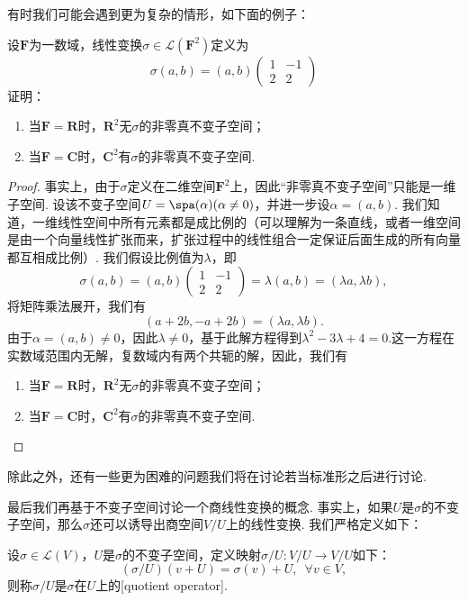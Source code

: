有时我们可能会遇到更为复杂的情形，如下面的例子：
\begin{example} \label{ex:18:不变子空间}
    设$\mathbf{F}$为一数域，线性变换$\sigma\in\mathcal{L}(\mathbf{F}^2)$定义为
    \[\sigma(a,b)=(a,b)\begin{pmatrix}
            1 & -1 \\ 2 & 2
        \end{pmatrix}\]
    证明：
    \begin{enumerate}
        \item 当$\mathbf{F}=\mathbf{R}$时，$\mathbf{R}^2$无$\sigma$的非零真不变子空间；

        \item 当$\mathbf{F}=\mathbf{C}$时，$\mathbf{C}^2$有$\sigma$的非零真不变子空间.
    \end{enumerate}
\end{example}

\begin{proof}
    事实上，由于$\sigma$定义在二维空间$\mathbf{F}^2$上，因此``非零真不变子空间''只能是一维子空间. 设该不变子空间$U=\spa(\alpha)(\alpha\neq 0)$，并进一步设$\alpha=(a,b)$. 我们知道，一维线性空间中所有元素都是成比例的（可以理解为一条直线，或者一维空间是由一个向量线性扩张而来，扩张过程中的线性组合一定保证后面生成的所有向量都互相成比例）. 我们假设比例值为$\lambda$，即
    \[\sigma(a,b)=(a,b)\begin{pmatrix}
            1 & -1 \\ 2 & 2
        \end{pmatrix}=\lambda(a,b)=(\lambda a,\lambda b),\]
    将矩阵乘法展开，我们有
    \[(a+2b,-a+2b)=(\lambda a,\lambda b).\]
    由于$\alpha=(a,b)\neq 0$，因此$\lambda\neq 0$，基于此解方程得到$\lambda^2-3\lambda+4=0$.这一方程在实数域范围内无解，复数域内有两个共轭的解，因此，我们有
    \begin{enumerate}
        \item 当$\mathbf{F}=\mathbf{R}$时，$\mathbf{R}^2$无$\sigma$的非零真不变子空间；

        \item 当$\mathbf{F}=\mathbf{C}$时，$\mathbf{C}^2$有$\sigma$的非零真不变子空间.
    \end{enumerate}
\end{proof}

除此之外，还有一些更为困难的问题我们将在讨论若当标准形之后进行讨论.

最后我们再基于不变子空间讨论一个商线性变换的概念. 事实上，如果$U$是$\sigma$的不变子空间，那么$\sigma$还可以诱导出商空间$V/U$上的线性变换. 我们严格定义如下：
\begin{definition}
    设$\sigma\in \mathcal{L}(V)$，$U$是$\sigma$的不变子空间，定义映射$\sigma/U:V/U\to V/U$如下：
    \[(\sigma/U)(v+U)=\sigma(v)+U,\enspace\forall v\in V,\]
    则称$\sigma/U$是$\sigma$在$U$上的[quotient operator].
\end{definition}

